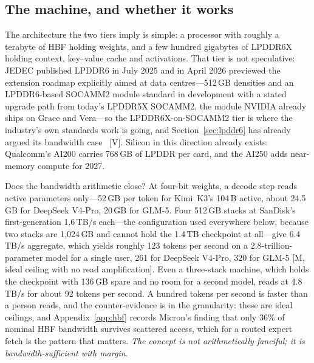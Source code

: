 \subsection{The machine, and whether it works}

The architecture the two tiers imply is simple: a processor with roughly a terabyte of HBF holding weights, and a few hundred gigabytes of LPDDR6X holding context, key--value cache and activations. That tier is not speculative: JEDEC published LPDDR6 in July 2025 and in April 2026 previewed the extension roadmap explicitly aimed at data centres---512\,GB densities and an LPDDR6-based SOCAMM2 module standard in development with a stated upgrade path from today's LPDDR5X SOCAMM2, the module NVIDIA already ships on Grace and Vera---so the LPDDR6X-on-SOCAMM2 tier is where the industry's own standards work is going, and Section~\ref{sec:lpddr6} has already argued its bandwidth case~\cite{lpddr6,jedec-lpddr6-roadmap,qualcomm-ai200} [V]. Silicon in this direction already exists: Qualcomm's AI200 carries 768\,GB of LPDDR per card, and the AI250 adds near-memory compute for 2027.

Does the bandwidth arithmetic close? At four-bit weights, a decode step reads active parameters only---52\,GB per token for Kimi~K3's 104\,B active, about 24.5\,GB for DeepSeek V4-Pro, 20\,GB for GLM-5. Four 512\,GB stacks at SanDisk's first-generation 1.6\,TB/s each---the configuration used everywhere below, because two stacks are 1,024\,GB and cannot hold the 1.4\,TB checkpoint at all---give 6.4\,TB/s aggregate, which yields roughly 123 tokens per second on a 2.8-trillion-parameter model for a single user, 261 for DeepSeek V4-Pro, 320 for GLM-5 [M, ideal ceiling with no read amplification]. Even a three-stack machine, which holds the checkpoint with 136\,GB spare and no room for a second model, reads at 4.8\,TB/s for about 92 tokens per second. A hundred tokens per second is faster than a person reads, and the counter-evidence is in the granularity: these are ideal ceilings, and Appendix~\ref{app:hbf} records Micron's finding that only 36\% of nominal HBF bandwidth survives scattered access, which for a routed expert fetch is the pattern that matters. \emph{The concept is not arithmetically fanciful; it is bandwidth-sufficient with margin.}

